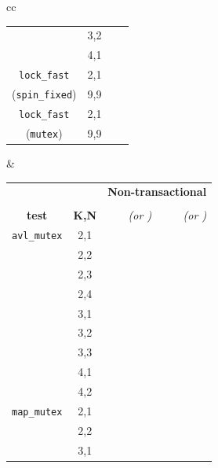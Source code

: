\begin{table}[t]
\begin{center}
\begin{tabular}{cc}
\begin{tabular}{cc||r|r}
			& 3,2 & \ETAdag{26h 42m} & \ETAdag{1223955} \\
			& 4,1 & \cpu{665.89} & \ints{15064}	\\
			\hline
			{\tt lock\_fast}
			& 2,1 & \cpu{3.25} & \ints{1}	\\
			({\tt spin\_fixed})
			& 9,9 & \cpu{4.61} & \ints{1}	\\
			\hline
			{\tt lock\_fast}
			& 2,1 & \cpu{3.19} & \ints{1}	\\
			({\tt mutex})
			& 9,9 & \cpu{4.62} & \ints{1}	\\
			\end{tabular}
			&
			\begin{tabular}{cc||r|r}
			& & \multicolumn{2}{c}{\bf Non-transactional} \\
			& & \cpu{\bf cpu (s)} & \ints{\bf SS size} \\
			\bf test & \bf K,N & \em (or \ETAdag{\bf \em ETA}) & \em (or \ETAdag{\bf \em est.}) \\
			\hline
			\hline
			{\tt avl\_mutex}
			& 2,1 & \cpu{3.48} & \ints{7} \\
			& 2,2 & \cpu{6.25} & \ints{85} \\
			& 2,3 & \cpu{24.69} & \ints{561} \\
			& 2,4 & \cpu{217.98} & \ints{4984} \\
			& 3,1 & \cpu{8.26} & \ints{129} \\
			& 3,2 & \cpu{1403.46} & \ints{30653} \\
			& 3,3 & \ETAdag{qqq} & \ETAdag{qqq} \\
			& 4,1 & \cpu{199.96} & \ints{4488} \\
			& 4,2 & \ETAdag{qqq} & \ETAdag{qqq} \\
			\cline{1-4}
			{\tt map\_mutex}
			& 2,1 & \cpu{39.81} & \ints{83} \\
			& 2,2 & \ETAdag{26h 21m} & \ETAdag{1085126} \\
			& 3,1 & \ETAdag{173d 17h} & \ETAdag{12572187} \\
			\cline{1-4}

\end{tabular}
\end{tabular}
\end{center}
\end{table}
